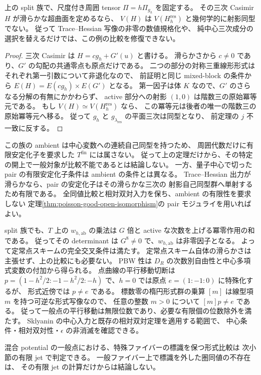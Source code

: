 \begin{corollary}
\label{cor:nfm-casimir-selection-obstruction}
上の split 族で、尺度付き周囲 tensor $\Pi=h\Pi_{g_h}$ を固定する。
その三次 Casimir $H$ が滑らかな超曲面を定めるなら、
$V(H)$ は $V(H_h^{\mathrm{res}})$ と幾何学的に射影同型でない。
従って Trace--Hessian 写像の非零の数値規格化や、
純中心三次成分の選択を替えるだけでは、この例の比較を修復できない。
\end{corollary}

\begin{proof}
三次 Casimir は $H=cg_h+G'(u)$ と書ける。
滑らかさから $c\ne0$ であり、$G'$ の勾配の共通零点も原点だけである。
二つの部分の対称三重線形形式はそれぞれ第一引数について非退化なので、
前証明と同じ mixed-block の条件から
$E(H)=E(cg_h)\times E(G')$ となる。
第一因子は体 $K$ なので、$G'$ のさらなる分解の有無にかかわらず、
active 部分への射影 $(1,0)$ は階数三の原始冪等元である。
もし $V(H)\simeq V(H_h^{\mathrm{res}})$ なら、
この冪等元は後者の唯一の階数三の原始冪等元へ移る。
従って $g_h$ と $g_{\lambda_{\mathrm{res}}}$ の平面三次は同型となり、
前定理の $j$ 不一致に反する。
\end{proof}

\begin{remark}[一般性と適用範囲]
この族の ambient は中心変数への連続自己同型を持つため、
周囲代数だけに有限安定化子を要求した $T^{\mathrm{fin}}$ には属さない。
従って上の定理だけから、その特定の開上で一般対象が比較不能であるとは結論しない。
一方、量子中心で切った pair の有限安定化子条件は ambient の条件とは異なる。
Trace--Hessian 出力が滑らかなら、pair の安定化子はその滑らかな三次の
射影自己同型群へ単射するため有限である。
全同値比較と相対双対入力を保ち、ambient の有限性を要求しない
定理\ref{thm:poisson-good-open-isomorphism}の pair モジュライを用いればよい。

split 族でも、$T$ 上の $w_{h,\mathrm{ab}}$ の乗法は
$G$ 倍と active な次数を上げる冪零作用の和である。
従ってその determinant は $G^8\ne0$ で、$w_{h,\mathrm{ab}}$ は非零因子となる。
よって定常点スキームの完全交叉条件は満たす。
定常点スキーム自体の滑らかさは主張せず、上の比較にも必要ない。
PBW 性は $D_R$ の次数別自由性と中心多項式変数の付加から得られる。
点曲線の平行移動切断は
$p=(1-h^2/2:-1-h^2/2:-h)$ で、$h=0$ では原点 $e=(1:-1:0)$ に特殊化するが、
形式近傍では $p\ne e$ である。
標数零の楕円形式群の乗算 $[m]$ は線型項 $m$ を持つ可逆な形式写像なので、
任意の整数 $m>0$ について $[m]p\ne e$ である。
従って一般点の平行移動は無限位数であり、必要な有限個の位数除外を満たす。
Sklyanin の中心入力と既存の相対双対定理を適用する範囲で、
中心条件・相対双対性・$\epsilon$ の非消滅を確認できる。

混合 potential の一般点における、特殊ファイバーの標識を保つ形式比較は
次小節の有限 jet で判定できる。
一般ファイバー上で標識を外した圏同値の不存在は、
その有限 jet の計算だけからは結論しない。
\end{remark}

